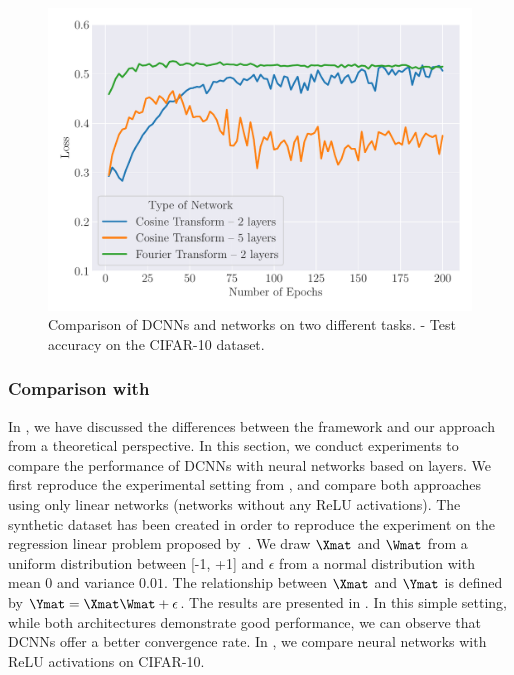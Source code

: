 \begin{figure}[ht]
   \centering
   \includegraphics[width=\scalefigure\textwidth]{figures/main/ch4-diagonal_circulant/acdc_cifar10.pdf}
   \caption{Comparison of DCNNs and \ACDC networks on two different tasks. - Test accuracy on the CIFAR-10 dataset.}
   \label{figure:ch4-acdc_cifar10}
\end{figure}



\subsubsection{Comparison with \ACDC}

In , we have discussed the differences between the \ACDC framework and our approach from a theoretical perspective.
In this section, we conduct experiments to compare the performance of DCNNs with neural networks based on \ACDC layers. 
We first reproduce the experimental setting from \citet{moczulski2016acdc}, and compare both approaches using only linear networks (\ie networks without any ReLU activations).
The synthetic dataset has been created in order to reproduce the experiment on the regression linear problem proposed by~\citet{moczulski2016acdc}.
We draw $\Xmat$ and $\Wmat$ from a uniform distribution between [-1, +1] and $\epsilon$ from a normal distribution with mean 0 and variance $0.01$.
The relationship between $\Xmat$ and $\Ymat$ is defined by $\Ymat = \Xmat\Wmat + \epsilon$. 
The results are presented in .
In this simple setting, while both architectures demonstrate good performance, we can observe that DCNNs offer a better convergence rate.
In , we compare neural networks with ReLU activations on CIFAR-10. 

